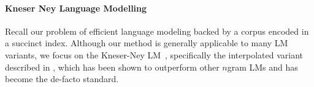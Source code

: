 
\paragraph{Kneser Ney Language Modelling}
\label{sec-lm}


Recall our problem of efficient \ngram language modeling backed by a corpus encoded in a succinct index. %
Although our method is generally applicable to many LM variants, we focus on the Kneser-Ney LM~\cite{kneser1995improved}, specifically the interpolated variant described in , which has been shown to outperform other $n$gram LMs and has become the de-facto standard.

